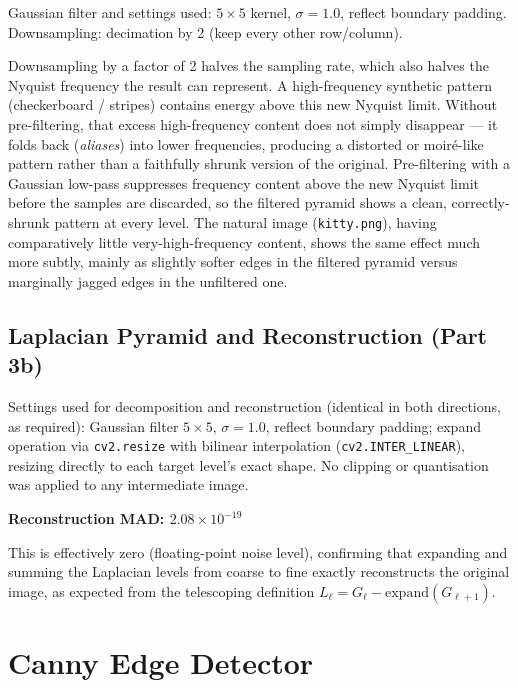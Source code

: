 \documentclass[11pt]{article}
\begin{document}
Gaussian filter and settings used: $5\times5$ kernel, $\sigma=1.0$, reflect boundary padding.
Downsampling: decimation by 2 (keep every other row/column).

Downsampling by a factor of 2 halves the sampling rate, which also halves the Nyquist
frequency the result can represent. A high-frequency synthetic pattern (checkerboard /
stripes) contains energy above this new Nyquist limit. Without pre-filtering, that excess
high-frequency content does not simply disappear --- it folds back (\emph{aliases}) into
lower frequencies, producing a distorted or moir\'e-like pattern rather than a faithfully
shrunk version of the original. Pre-filtering with a Gaussian low-pass suppresses frequency
content above the new Nyquist limit before the samples are discarded, so the filtered
pyramid shows a clean, correctly-shrunk pattern at every level. The natural image
(\texttt{kitty.png}), having comparatively little very-high-frequency content, shows the
same effect much more subtly, mainly as slightly softer edges in the filtered pyramid
versus marginally jagged edges in the unfiltered one.

\subsection{Laplacian Pyramid and Reconstruction (Part 3b)}

Settings used for decomposition and reconstruction (identical in both directions, as
required): Gaussian filter $5\times5$, $\sigma=1.0$, reflect boundary padding; expand
operation via \texttt{cv2.resize} with bilinear interpolation (\texttt{cv2.INTER\_LINEAR}),
resizing directly to each target level's exact shape. No clipping or quantisation was
applied to any intermediate image.

\begin{center}
\textbf{Reconstruction MAD: $2.08 \times 10^{-19}$}
\end{center}

This is effectively zero (floating-point noise level), confirming that expanding and
summing the Laplacian levels from coarse to fine exactly reconstructs the original image,
as expected from the telescoping definition $L_\ell = G_\ell - \text{expand}(G_{\ell+1})$.

\section{Canny Edge Detector}
\end{document}
